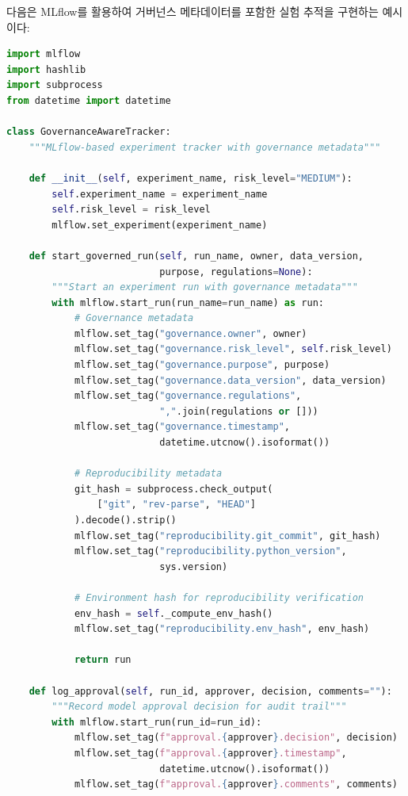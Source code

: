 다음은 MLflow를 활용하여 거버넌스 메타데이터를 포함한 실험 추적을 구현하는 예시이다:

\begin{lstlisting}[language=Python, caption={MLflow Experiment Tracking with Governance Metadata}, label={lst:mlflow_governance_platform}]
import mlflow
import hashlib
import subprocess
from datetime import datetime

class GovernanceAwareTracker:
    """MLflow-based experiment tracker with governance metadata"""

    def __init__(self, experiment_name, risk_level="MEDIUM"):
        self.experiment_name = experiment_name
        self.risk_level = risk_level
        mlflow.set_experiment(experiment_name)

    def start_governed_run(self, run_name, owner, data_version,
                           purpose, regulations=None):
        """Start an experiment run with governance metadata"""
        with mlflow.start_run(run_name=run_name) as run:
            # Governance metadata
            mlflow.set_tag("governance.owner", owner)
            mlflow.set_tag("governance.risk_level", self.risk_level)
            mlflow.set_tag("governance.purpose", purpose)
            mlflow.set_tag("governance.data_version", data_version)
            mlflow.set_tag("governance.regulations",
                           ",".join(regulations or []))
            mlflow.set_tag("governance.timestamp",
                           datetime.utcnow().isoformat())

            # Reproducibility metadata
            git_hash = subprocess.check_output(
                ["git", "rev-parse", "HEAD"]
            ).decode().strip()
            mlflow.set_tag("reproducibility.git_commit", git_hash)
            mlflow.set_tag("reproducibility.python_version",
                           sys.version)

            # Environment hash for reproducibility verification
            env_hash = self._compute_env_hash()
            mlflow.set_tag("reproducibility.env_hash", env_hash)

            return run

    def log_approval(self, run_id, approver, decision, comments=""):
        """Record model approval decision for audit trail"""
        with mlflow.start_run(run_id=run_id):
            mlflow.set_tag(f"approval.{approver}.decision", decision)
            mlflow.set_tag(f"approval.{approver}.timestamp",
                           datetime.utcnow().isoformat())
            mlflow.set_tag(f"approval.{approver}.comments", comments)


\end{lstlisting}
